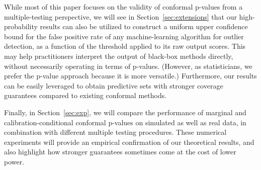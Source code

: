 While most of this paper focuses on the validity of conformal p-values from a multiple-testing perspective, we will see in Section~\ref{sec:extensions} that our high-probability results can also be utilized to construct a uniform upper confidence bound for the false positive rate of any machine-learning algorithm for outlier detection, as a function of the threshold applied to its raw output scores. This may help practitioners interpret the output of black-box methods directly, without necessarily operating in terms of p-values. (However, as statisticians, we prefer the p-value approach because it is more versatile.)
Furthermore, our results can be easily leveraged to obtain predictive sets with stronger coverage guarantees compared to existing conformal methods.

Finally, in Section~\ref{sec:exp}, we will compare the performance of marginal and calibration-conditional conformal p-values on simulated as well as real data, in combination with different multiple testing procedures. These numerical experiments will provide an empirical confirmation of our theoretical results, and also highlight how stronger guarantees sometimes come at the cost of lower power.



